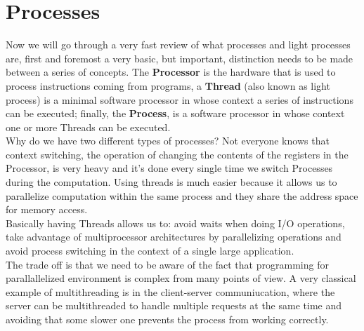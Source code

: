 \section{Processes}
Now we will go through a very fast review of what processes and light processes are, first and foremost a very basic, but important, distinction needs to be made between a series of concepts.
The \textbf{Processor} is the hardware that is used to process instructions coming from programs, a \textbf{Thread} (also known as light process) is a minimal software processor in whose context a series of instructions can be executed; finally, the \textbf{Process}, is a software processor in whose context one or more Threads can be executed. \\
Why do we have two different types of processes? Not everyone knows that context switching, the operation of changing the contents of the registers in the Processor, is very heavy and it's done every single time we switch Processes during the computation. Using threads is much easier because it allows us to parallelize computation within the same process and they share the address space for memory access. \\
Basically having Threads allows us to: avoid waits when doing I/O operations, take advantage of multiprocessor architectures by parallelizing operations and avoid process switching in the context of a single large application. \\
The trade off is that we need to be aware of the fact that programming for parallallelized environment is complex from many points of view. A very classical example of multithreading is in the client-server communiucation, where the server can be multithreaded to handle multiple requests at the same time and avoiding that some slower one prevents the process from working correctly. \\